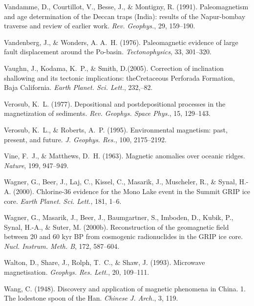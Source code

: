 \documentclass[,plain]{tauxe}
\begin{document}
\begin{thebibliography}{}
\bibitem{}%
Vandamme, D., Courtillot, V., Besse, J., \& Montigny, R. (1991).
Paleomagnetism and age determination of the Deccan traps (India): results of the Napur-bombay traverse and review of earlier work.
{\it Rev. Geophys.}, 29, 159--190.

\bibitem{}%
Vandenberg, J., \& Wonders, A. A.~H. (1976).
Paleomagnetic evidence of large fault displacement around the Po-basin.
{\it Tectonophysics}, 33, 301--320.

\bibitem{}%
Vaughn, J., Kodama, K.~P., \& Smith, D.\break (2005).
Correction of inclination shallowing and its tectonic implications: the\break Cretaceous Perforada Formation, Baja California.
{\it Earth Planet. Sci. Lett.}, 232,--82.

\bibitem{}%
Verosub, K.~L. (1977).
Depositional and postdepositional processes in the magnetization of sediments.
{\it Rev. Geophys. Space Phys.}, 15, 129--143.

\bibitem{}%
Verosub, K.~L., \& Roberts, A.~P. (1995).
Environmental magnetism: past, present, and future.
{\it J. Geophys. Res.}, 100, 2175--2192.

\bibitem{}%
Vine, F.~J., \& Matthews, D.~H. (1963).
Magnetic anomalies over oceanic ridges.
{\it Nature}, 199, 947--949.

\bibitem{}%
Wagner, G., Beer, J., Laj, C., Kissel, C., Masarik, J., Muscheler, R., \& Synal, H.-A. (2000).
Chlorine-36 evidence for the Mono Lake event in the Summit GRIP ice core.
{\it Earth Planet. Sci. Lett.}, 181, 1--6.

\bibitem{}%
Wagner, G., Masarik, J., Beer, J., Baumgartner, S., Imboden, D., Kubik, P., Synal, H.-A., \& Suter, M. (2000b).
Reconstruction of the geomagnetic field between 20 and 60 kyr BP from cosmogenic radionuclides in the GRIP ice core.
{\it Nucl. Instrum. Meth. B}, 172, 587--604.

\bibitem{}%
Walton, D., Share, J., Rolph, T.~C., \& Shaw, J. (1993).
Microwave magnetisation.
{\it Geophys. Res. Lett.}, 20, 109--111.

\bibitem{}%
Wang, C. (1948).
Discovery and application of magnetic phenomena in China. 1. The lodestone spoon of the Han.
{\it Chinese J. Arch.}, 3, 119.


\end{thebibliography}
\end{document}
